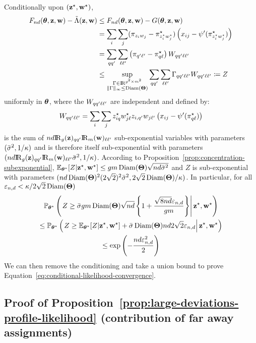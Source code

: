 \proofbegin
Conditionally upon $(\mathbf{z}^\star, \mathbf{w}^\star)$,
\begin{align*}
   \Fnd(\btheta, \bz, \bw) - \Lambtilde(\bz,\bw) & \leq \Fnd(\btheta, \bz, \bw) - \G(\btheta, \bz,\bw) \\
  & = \sum_{\ii} \sum_{\jj} (\al_{\zi\wj} - \al^\vrai_{\zi^\vrai \wj^\vrai}) \left(x_{ij} - \normp(\al^\vrai_{\zi^\vrai \wj^\vrai}) \right)  \\
  & = \sum_{\kk \kp} \sum_{\el \lp} \left(\al_{\kp\lp} - \al^\vrai_{\kk \el} \right) W_{\kk \kp \el \lp} \\
  & \leq \sup_{\substack{\Gamma \in \R^{\g^2 \times \m^2} \\ \| \Gamma \|_{\infty} \leq \Diam(\bTheta)}} \sum_{\kk \kp} \sum_{\el \lp} \Gamma_{\kk \kp \el \lp} W_{\kk \kp \el \lp} \coloneqq Z
\end{align*}
uniformly in $\boldsymbol{\theta}$, where the $W_{q q' \ell \ell'}$ are independent and defined by:
\begin{equation*}
  W_{\kk \kp \el \lp} = \sum_{\ii} \sum_{\jj} \z^\vrai_{\ii \kk} \w^\vrai_{\jj \el} \z_{\ii, \kp} \w_{\jj \lp}\left(x_{ij} - \normp(\al^\vrai_{\kk\el}) \right)
\end{equation*}
is the sum of $\n\dd \Rgbz_{\kk\kp} \Rmbw_{\el\lp}$ sub-exponential variables with parameters $(\bar{\sigma}^2, 1/\kappa)$ and is therefore itself sub-exponential with parameters $(\n\dd \Rgbz_{\kk\kp} \Rmbw_{\el\lp} \vmax^2, 1 / \neighborsize)$. According to Proposition~\ref{prop:concentration-subexponential}, $\mathbb{E}_{\boldsymbol{\theta}^\star}[Z|\mathbf{z}^\star, \mathbf{w}^\star] \leq g m \operatorname{Diam}(\boldsymbol{\Theta}) \sqrt{nd \bar{\sigma}^2}$ and 
$Z$ is sub-exponential with parameters $(nd \operatorname{Diam}(\boldsymbol{\Theta})^2 (2\sqrt{2})^2\bar{\sigma}^2, 2\sqrt{2}\operatorname{Diam}(\boldsymbol{\Theta}) / \kappa)$. In particular, for all $\varepsilon_{n,d} < \kappa / 2\sqrt{2}\operatorname{Diam}(\boldsymbol{\Theta})$
\begin{multline*}
  \Prob_{\bthetas}\left( \left. Z \geq \vmax \g \m \Diam(\bTheta) \sqrt{nd} \left\{ 1 + \frac{\sqrt{8\n\dd} \vareps_{\n,\dd}}{\g \m} \right\} \right| \bzs, \bws \right) \\
  \leq  \Prob_{\bthetas}\left( \left. Z \geq \Esp_{\bthetas}[Z|\bzs, \bws] + \vmax \Diam(\bTheta) \n\dd 2\sqrt{2}\vareps_{\n,\dd} \right| \bzs, \bws \right) \\  \leq \exp \left( - \frac{\n\dd\vareps^2_{\n,\dd}}{2} \right)
\end{multline*}
We can then remove the conditioning and take a union bound to prove Equation~\eqref{eq:conditional-likelihood-convergence}. 
\proofend

\subsection{Proof of Proposition~\ref{prop:large-deviations-profile-likelihood} (contribution of far away assignments)}

